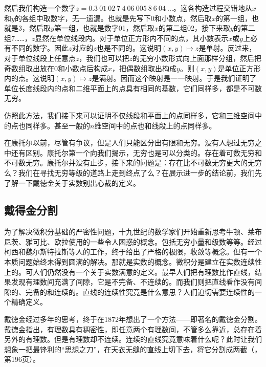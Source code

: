 \documentclass{article}
\begin{document}
然后我们构造一个数字$ z = 0.3\ 01\ 02\ 7\ 4\ 06\ 005\ 8\ 6\ 04\ ...$。这各构造过程交错地从$x$和$y$的各组中取数字，无一遗漏。也就是先写下0和小数点，然后取$x$的第一组，也就是3，然后取$y$第一组，也就是数字01，然后取$x$的第二组02，接下来取$y$的第二组7……，$z$显然在单位线段内。对于单位正方形内不同的点，其小数表示$x$或$y$上必有不同的数字。因此$z$对应的$z$也是不同的。这说明$(x, y) \mapsto z$是单射。反过来，对于单位线段上任意点$z$，我们也可以把$z$的无穷小数形式向上面那样分组，然后把奇数组取出放在0和小数点后构成$x$，把偶数组取出构成$y$。则$(x, y)$是单位正方形内的点。这说明$(x, y) \mapsto z$是满射。因而这个映射是一一映射。于是我们证明了单位长度线段内的点和二维平面上的点具有相同的基数，它们同样多，都是不可数无穷。

仿照此方法，我们接下来可以证明不仅线段和平面上的点同样多，它和三维空间中的点也同样多。甚至一般的$n$维空间中的点也和线段上的点同样多。

在康托尔以前，尽管有争议，但是人们只能区分出有限和无穷。没有人想过无穷之中还有区别。康托尔第一个向我们揭示，无穷也是可以分类的。存在着可数无穷和不可数无穷。康托尔并没有止步，接下来的问题是：存在比不可数无穷更大的无穷么？我们在寻找无穷等级的道路上走到终点了么？在展示进一步的结论前，我们先了解一下戴徳金关于实数别出心裁的定义。

\begin{Exercise}
\end{Exercise}

\subsection{戴得金分割}
为了解决微积分基础的严密性问题，十九世纪的数学家们开始重新思考牛顿、莱布尼茨、雅可比、欧拉使用的一些令人困惑的概念。包括无穷小量和级数等等。经过柯西和魏尔斯特拉斯等人的工作，终于给出了严格的极限，收敛等概念。但有一个本质问题始终未得到圆满的解决。那就是实数的概念。微积分是建立在实数连续性上的。可人们仍然没有一个关于实数满意的定义。最早人们把有理数比作直线，结果发现有理数间充满了间隙，它是不完备、不连续的。而我们则把直线看作没有间隙的、完备的和连续的。直线的连续性究竟是什么意思？人们迫切需要连续性的一个精确定义。

戴徳金经过多年的思考，终于在1872年想出了一个方法——即著名的戴徳金分割。戴徳金指出，有理数具有稠密性，即任意两个有理数间，不管多么靠近，总存在着另外的有理数。但是有理数却不连续。连续的直线究竟意味着什么呢？此时让我们想象一把最锋利的“思想之刀”，在天衣无缝的直线上切下去，将它分割成两截（\cite{HanXueTao16}，第196页）。
\end{document}
